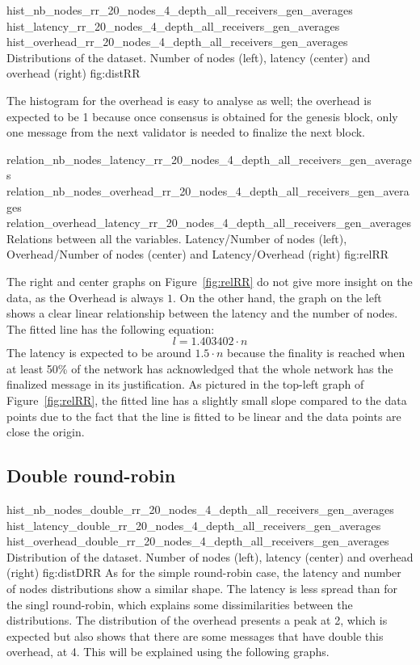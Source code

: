 \triplefigure
    {hist_nb_nodes_rr_20_nodes_4_depth_all_receivers_gen_averages}
    {hist_latency_rr_20_nodes_4_depth_all_receivers_gen_averages}
    {hist_overhead_rr_20_nodes_4_depth_all_receivers_gen_averages}
    {Distributions of the dataset. Number of nodes (left), latency (center)
    and overhead (right) }
    {fig:distRR}

The histogram for the overhead is easy to analyse as well; the overhead is
expected to be 1 because once consensus is obtained for the genesis block, only
one message from the next validator is needed to finalize the next block.

\triplefigure
    {relation_nb_nodes_latency_rr_20_nodes_4_depth_all_receivers_gen_averages}
    {relation_nb_nodes_overhead_rr_20_nodes_4_depth_all_receivers_gen_averages}
    {relation_overhead_latency_rr_20_nodes_4_depth_all_receivers_gen_averages}
    {Relations between all the variables. Latency/Number of nodes (left),
    Overhead/Number of nodes (center) and Latency/Overhead (right)}
    {fig:relRR}

The right and center graphs on Figure~\ref{fig:relRR} do not give more insight on the
data, as the Overhead is always \(1\). On the other hand, the graph on the left
shows a clear linear relationship between the latency and the number of nodes.
The fitted line has the following equation:
\[l = 1.403402\cdot n\]
The latency is expected to be around \(1.5\cdot n\) because the finality is
reached when at least 50\% of the network has acknowledged that the whole
network has the finalized message in its justification. As pictured in the
top-left graph of Figure~\ref{fig:relRR}, the fitted line has a slightly small
slope compared to the data points due to the fact that the line is fitted to be
linear and the data points are close the origin. 

\subsection{Double round-robin}
\triplefigure
    {hist_nb_nodes_double_rr_20_nodes_4_depth_all_receivers_gen_averages}
    {hist_latency_double_rr_20_nodes_4_depth_all_receivers_gen_averages}
    {hist_overhead_double_rr_20_nodes_4_depth_all_receivers_gen_averages}
    {Distribution of the dataset. Number of nodes (left), latency (center)
    and overhead (right)}
    {fig:distDRR}
As for the simple round-robin case, the latency and number of nodes
distributions show a similar shape. The latency is less spread than for the
singl round-robin, which explains some dissimilarities between the
distributions. The distribution of the overhead presents a peak at 2, which is
expected but also shows that there are some messages that have double this
overhead, at 4. This will be explained using the following graphs. 

